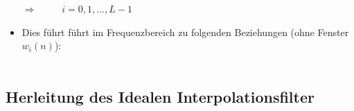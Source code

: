\begin{itemize}
		 \hspace*{1cm}$\Rightarrow\quad$$\quad\;\; i=0,1,...,L-1$\\[-0.1cm] 
		 \item Dies führt führt im Frequenzbereich zu folgenden Beziehungen (ohne Fenster $w_i(n)$):\\[0.2cm]
		 \hspace*{1cm}$\qquad$\\
		\end{itemize}

	\subsection{Herleitung des Idealen Interpolationsfilter}%
